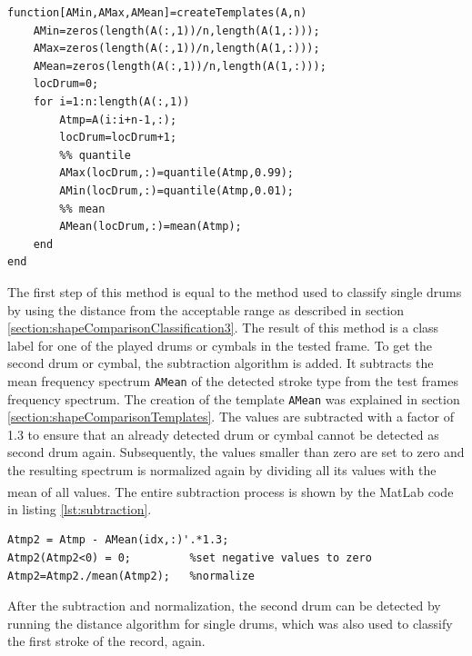 \begin{lstlisting}[caption={Template creation including mean template.},label={lst:templates2}]
function[AMin,AMax,AMean]=createTemplates(A,n)
	AMin=zeros(length(A(:,1))/n,length(A(1,:)));
	AMax=zeros(length(A(:,1))/n,length(A(1,:)));
	AMean=zeros(length(A(:,1))/n,length(A(1,:)));
	locDrum=0;
	for i=1:n:length(A(:,1))				
		Atmp=A(i:i+n-1,:);
		locDrum=locDrum+1;				
		%% quantile
		AMax(locDrum,:)=quantile(Atmp,0.99);
		AMin(locDrum,:)=quantile(Atmp,0.01);
		%% mean
		AMean(locDrum,:)=mean(Atmp);  
	end
end
\end{lstlisting}

The first step of this method is equal to the method used to classify single drums by using the distance from the acceptable range as described in section \ref{section:shapeComparisonClassification3}. The result of this method is a class label for one of the played drums or cymbals in the tested frame. To get the second drum or cymbal, the subtraction algorithm is added. It subtracts the mean frequency spectrum \lstinline{AMean} of the detected stroke type from the test frames frequency spectrum. The creation of the template \lstinline{AMean} was explained in section \ref{section:shapeComparisonTemplates}. The values are subtracted with a factor of 1.3 to ensure that an already detected drum or cymbal cannot be detected as second drum again. Subsequently, the values smaller than zero are set to zero and the resulting spectrum is normalized again by dividing all its values with the mean of all values. The entire subtraction process is shown by the MatLab\textsuperscript{\textregistered} code in listing \ref{lst:subtraction}. 

\begin{lstlisting}[caption={Subtraction of the mean spectrum of the extracted class label from the frequency spectrum of a frame with two drums played at once.},label={lst:subtraction}]
Atmp2 = Atmp - AMean(idx,:)'.*1.3;
Atmp2(Atmp2<0) = 0;         %set negative values to zero
Atmp2=Atmp2./mean(Atmp2);   %normalize 
\end{lstlisting}

After the subtraction and normalization, the second drum can be detected by running the distance algorithm for single drums, which was also used to classify the first stroke of the record, again.

